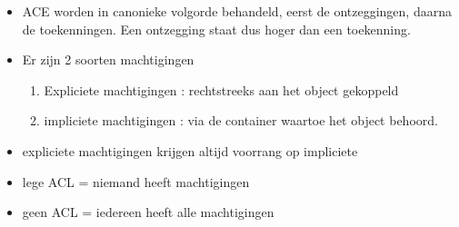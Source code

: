 \begin{itemize}
\item ACE worden in canonieke volgorde behandeld, eerst de ontzeggingen, daarna de toekenningen. Een ontzegging staat dus hoger dan een toekenning.
\item Er zijn 2 soorten machtigingen
\begin{enumerate}
\item Expliciete machtigingen : rechtstreeks aan het object gekoppeld
\item impliciete machtigingen : via de container waartoe het object behoord.
\end{enumerate}
\item expliciete machtigingen krijgen altijd voorrang op impliciete
\item lege ACL = niemand heeft machtigingen
\item geen ACL = iedereen heeft alle machtigingen
\end{itemize}

